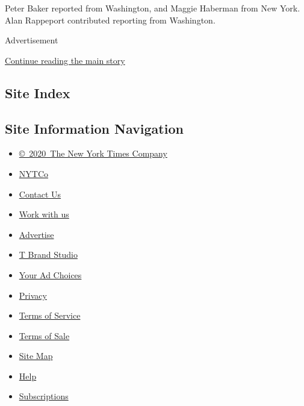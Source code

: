 Peter Baker reported from Washington, and Maggie Haberman from New York.
Alan Rappeport contributed reporting from Washington.

Advertisement

\protect\hyperlink{after-bottom}{Continue reading the main story}

\hypertarget{site-index}{%
\subsection{Site Index}\label{site-index}}

\hypertarget{site-information-navigation}{%
\subsection{Site Information
Navigation}\label{site-information-navigation}}

\begin{itemize}
\tightlist
\item
  \href{https://help.nytimes3xbfgragh.onion/hc/en-us/articles/115014792127-Copyright-notice}{©~2020~The
  New York Times Company}
\end{itemize}

\begin{itemize}
\tightlist
\item
  \href{https://www.nytco.com/}{NYTCo}
\item
  \href{https://help.nytimes3xbfgragh.onion/hc/en-us/articles/115015385887-Contact-Us}{Contact
  Us}
\item
  \href{https://www.nytco.com/careers/}{Work with us}
\item
  \href{https://nytmediakit.com/}{Advertise}
\item
  \href{http://www.tbrandstudio.com/}{T Brand Studio}
\item
  \href{https://www.nytimes3xbfgragh.onion/privacy/cookie-policy\#how-do-i-manage-trackers}{Your
  Ad Choices}
\item
  \href{https://www.nytimes3xbfgragh.onion/privacy}{Privacy}
\item
  \href{https://help.nytimes3xbfgragh.onion/hc/en-us/articles/115014893428-Terms-of-service}{Terms
  of Service}
\item
  \href{https://help.nytimes3xbfgragh.onion/hc/en-us/articles/115014893968-Terms-of-sale}{Terms
  of Sale}
\item
  \href{https://spiderbites.nytimes3xbfgragh.onion}{Site Map}
\item
  \href{https://help.nytimes3xbfgragh.onion/hc/en-us}{Help}
\item
  \href{https://www.nytimes3xbfgragh.onion/subscription?campaignId=37WXW}{Subscriptions}
\end{itemize}
